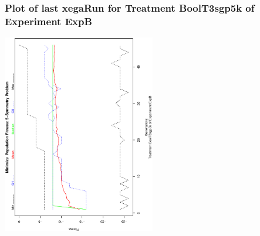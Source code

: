  \begin{frame}
 \frametitle{ Plot of last xegaRun for Treatment BoolT3sgp5k of Experiment ExpB }
 \begin{center}
\includegraphics[width=0.5\textwidth, angle=-90]
{ExpBPlotPopStatsFigure018.eps}
 \end{center}
 \label{report/ExpBPlotPopStatsFigure018.eps}  
 \end{frame}

